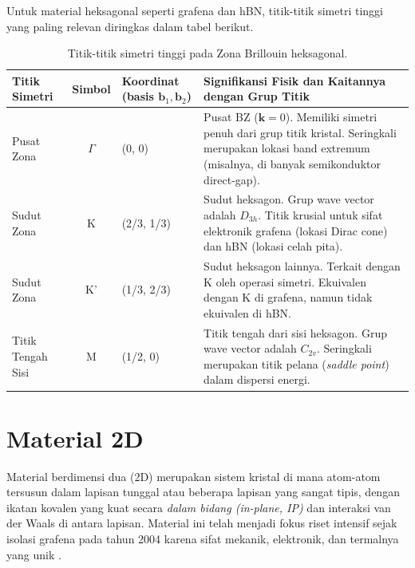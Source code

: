 Untuk material heksagonal seperti grafena dan hBN, titik-titik simetri tinggi yang paling relevan diringkas dalam tabel berikut.

\begin{table}[h!]
\centering
\caption{Titik-titik simetri tinggi pada Zona Brillouin heksagonal.}
\begin{tabular}{|l|c|l|p{7cm}|}
\hline
\textbf{Titik Simetri} & \textbf{Simbol} & \textbf{Koordinat (basis $\mathbf{b}_1, \mathbf{b}_2$)} & \textbf{Signifikansi Fisik dan Kaitannya dengan Grup Titik} \\
\hline
Pusat Zona & $\Gamma$ & (0, 0) & Pusat BZ ($\mathbf{k}=0$). Memiliki simetri penuh dari grup titik kristal. Seringkali merupakan lokasi band extremum (misalnya, di banyak semikonduktor direct-gap). \\
\hline
Sudut Zona & K & (2/3, 1/3) & Sudut heksagon. Grup wave vector adalah $D_{3h}$. Titik krusial untuk sifat elektronik grafena (lokasi Dirac cone) dan hBN (lokasi celah pita). \\
\hline
Sudut Zona & K' & (1/3, 2/3) & Sudut heksagon lainnya. Terkait dengan K oleh operasi simetri. Ekuivalen dengan K di grafena, namun tidak ekuivalen di hBN. \\
\hline
Titik Tengah Sisi & M & (1/2, 0) & Titik tengah dari sisi heksagon. Grup wave vector adalah $C_{2v}$. Seringkali merupakan titik pelana (\emph{saddle point}) dalam dispersi energi. \\
\hline
\end{tabular}
\label{tab:symmetry_points}
\end{table}

\section{Material 2D}
Material berdimensi dua (2D) merupakan sistem kristal di mana atom-atom tersusun dalam lapisan tunggal atau beberapa lapisan yang sangat tipis, dengan ikatan kovalen yang kuat secara \emph{dalam bidang (in-plane, IP)} dan interaksi van der Waals di antara lapisan.
Material ini telah menjadi fokus riset intensif sejak isolasi grafena pada tahun 2004 karena sifat mekanik, elektronik, dan termalnya yang unik \citep{Novoselov2004, Geim2007}.

